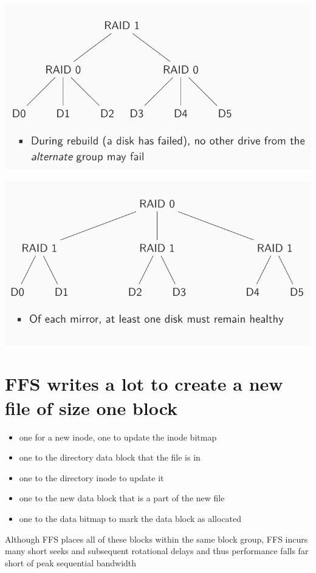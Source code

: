 \begin{minipage}{.5\linewidth}
  \includegraphics[width=\linewidth]{imgs/raid01}
\end{minipage}
\begin{minipage}{.5\linewidth}
  \includegraphics[width=\linewidth]{imgs/raid10}
\end{minipage}
\section*{FFS writes a lot to create a new file of size one block}
\begin{itemize}
\item one for a new inode, one to update the inode bitmap
\item one to the directory data block that the file is in
\item one to the directory inode to update it
\item one to the new data block that is a part of the new file
\item one to the data bitmap to mark the data block as allocated
\end{itemize}
Although FFS places all of these blocks within the same block group, FFS incurs many short seeks and subsequent rotational delays and thus performance falls far short of peak sequential bandwidth

